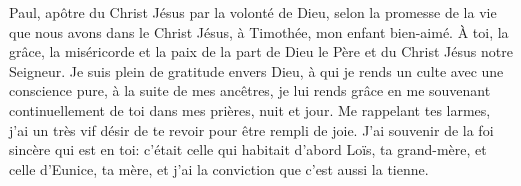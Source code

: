 Paul, apôtre du Christ Jésus par la volonté de Dieu,
	selon la promesse de la vie que nous avons dans le Christ Jésus,
	à Timothée, mon enfant bien-aimé.
À toi, la grâce, la miséricorde et la paix
	de la part de Dieu le Père et du Christ Jésus notre Seigneur.
Je suis plein de gratitude envers Dieu,
	à qui je rends un culte avec une conscience pure, à la suite de mes ancêtres,
	je lui rends grâce en me souvenant continuellement de toi
		dans mes prières, nuit et jour.
Me rappelant tes larmes, j’ai un très vif désir de te revoir pour être rempli de joie.
J’ai souvenir de la foi sincère qui est en toi:
	c’était celle qui habitait d’abord Loïs, ta grand-mère, et celle d’Eunice, ta mère,
	et j’ai la conviction que c’est aussi la tienne.
